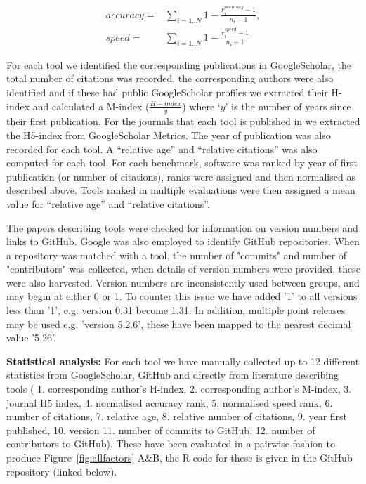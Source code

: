 \documentclass[fleqn,10pt]{SelfArx} %
\begin{document}
\begin{equation*}
\begin{split}
accuracy =& \sum_{i=1..N} 1-\frac{r^{accuracy}_i-1}{n_i-1}, \\
speed    =& \sum_{i=1..N} 1-\frac{r^{speed   }_i-1}{n_i-1}
\end{split}
\end{equation*}
 
For each tool we identified the corresponding publications in
GoogleScholar, the total number of citations was recorded, the
corresponding authors were also identified and if these had public
GoogleScholar profiles we extracted their H-index and calculated a
M-index ($\frac{H-index}{y}$) where ‘$y$’ is the number of years since
their first publication. For the journals that each tool is published
in we extracted the H5-index
from GoogleScholar Metrics. The year of publication was also recorded for each
tool. A “relative age” and “relative citations” was also computed for
each tool. For each benchmark, software was ranked by year of first
publication (or number of citations), ranks were assigned and then
normalised as described above. Tools ranked in multiple evaluations
were then assigned a mean value for “relative age” and “relative
citations”.

The papers describing tools were checked for information on version numbers and links to GitHub. 
Google was also employed to identify GitHub repositories. When a repository was matched with a tool, the number of "commits" and number of "contributors" was collected, when details of version numbers were provided, these were also harvested. 
Version numbers are inconsistently used between groups, and may begin at either 0 or 1. To counter this issue we have added '1' to all versions less than '1', e.g. version 0.31 become 1.31. In addition, multiple point releases may be used e.g. 'version 5.2.6', these have been mapped to the nearest decimal value '5.26'.

\textbf{Statistical analysis:} For each tool we have manually collected up to 12 different
statistics from GoogleScholar, GitHub and directly from literature describing tools (
1. corresponding author’s H-index, 
2. corresponding author’s M-index, 
3. journal H5 index, 
4. normalised accuracy rank, 
5. normalised speed rank, 
6. number of citations, 
7. relative age, 
8. relative number of citations, 
9. year first published, 
10. version
11. number of commits to GitHub,
12. number of contributors to GitHub). 
These have been evaluated in a pairwise fashion to
produce Figure~\ref{fig:allfactors} A\&B, the R code for these is
given in the GitHub repository (linked below).
\end{document}
